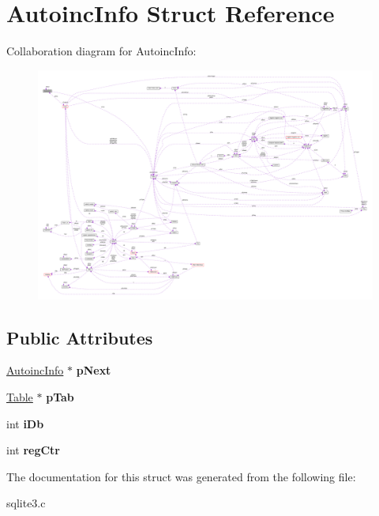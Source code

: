 \hypertarget{structAutoincInfo}{}\section{Autoinc\+Info Struct Reference}
\label{structAutoincInfo}


Collaboration diagram for Autoinc\+Info\+:\nopagebreak
\begin{figure}[H]
\begin{center}
\leavevmode
\includegraphics[width=350pt]{structAutoincInfo__coll__graph}
\end{center}
\end{figure}
\subsection*{Public Attributes}
\begin{DoxyCompactItemize}
\item 
\hyperlink{structAutoincInfo}{Autoinc\+Info} $\ast$ {\bfseries p\+Next}\hypertarget{structAutoincInfo_aa77fb076beea013c25df4e49dba4b6f6}{}\label{structAutoincInfo_aa77fb076beea013c25df4e49dba4b6f6}

\item 
\hyperlink{structTable}{Table} $\ast$ {\bfseries p\+Tab}\hypertarget{structAutoincInfo_a0cf785b0cbaddb4215a8408f8e13075e}{}\label{structAutoincInfo_a0cf785b0cbaddb4215a8408f8e13075e}

\item 
int {\bfseries i\+Db}\hypertarget{structAutoincInfo_ae7234e0916b11ef97377bdfd6c7c4568}{}\label{structAutoincInfo_ae7234e0916b11ef97377bdfd6c7c4568}

\item 
int {\bfseries reg\+Ctr}\hypertarget{structAutoincInfo_af180977ee7dcc8cab862185692f57cc5}{}\label{structAutoincInfo_af180977ee7dcc8cab862185692f57cc5}

\end{DoxyCompactItemize}


The documentation for this struct was generated from the following file\+:\begin{DoxyCompactItemize}
\item 
sqlite3.\+c\end{DoxyCompactItemize}
